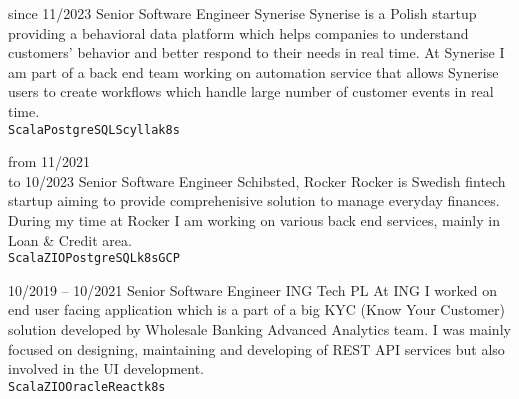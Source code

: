 \documentclass[9pt]{developercv} %
\begin{document}
\begin{entrylist}
	\entry
		{since 11/2023}
		{Senior Software Engineer}
		{Synerise}
    {Synerise is a Polish startup providing a behavioral data platform which helps companies to understand customers' behavior and better respond to their needs in real time. At Synerise I am part of a back end team working on automation service that allows Synerise users to create workflows which handle large number of customer events in real time.\\
		\texttt{Scala}\slashsep\texttt{PostgreSQL}\slashsep\texttt{Scylla}\slashsep\texttt{k8s}}

	\entry
		{from 11/2021 \\ to 10/2023}
		{Senior Software Engineer}
		{Schibsted, Rocker}
    {Rocker is Swedish fintech startup aiming to provide comprehenisive solution to manage everyday finances. During my time at Rocker I am working on various back end services, mainly in Loan \& Credit area.\\
		\texttt{Scala}\slashsep\texttt{ZIO}\slashsep\texttt{PostgreSQL}\slashsep\texttt{k8s}\slashsep\texttt{GCP}}

	\entry
		{10/2019 -- 10/2021}
		{Senior Software Engineer}
		{ING Tech PL}
		{At ING I worked on end user facing application which is a part of a big KYC (Know Your Customer) solution developed by Wholesale Banking Advanced Analytics team. I was mainly focused on designing, maintaining and developing of REST API services but also involved in the UI development.\\
		\texttt{Scala}\slashsep\texttt{ZIO}\slashsep\texttt{Oracle}\slashsep\texttt{React}\slashsep\texttt{k8s}}


\end{entrylist}
\end{document}
